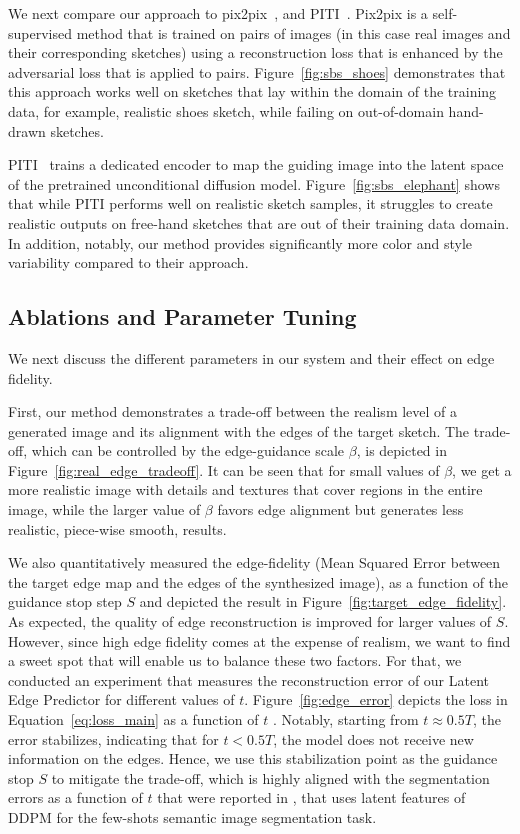 We next compare our approach to pix2pix~\cite{isola2017image}, and PITI~\cite{PITI22}. Pix2pix is a self-supervised method that is trained on pairs of images (in this case real images and their corresponding sketches) using a reconstruction loss that is enhanced by the adversarial loss that is applied to pairs. Figure~\ref{fig:sbs_shoes} demonstrates that this approach works well on sketches that lay within the domain of the training data, for example, realistic shoes sketch, while failing on out-of-domain hand-drawn sketches. 

PITI~\cite{PITI22} trains a dedicated encoder to map the guiding image into the latent space of the pretrained unconditional diffusion model. 
Figure~\ref{fig:sbs_elephant} shows that while PITI performs well on realistic sketch samples, it struggles to create realistic outputs on free-hand sketches that are out of their training data domain. In addition, notably, our method provides significantly more color and style variability compared to their approach.

\subsection{Ablations and Parameter Tuning}
\label{sec:parameters}
We next discuss the different parameters in our system and their effect on edge fidelity.

First, our method demonstrates a trade-off between the realism level of a generated image and its alignment with the edges of the target sketch. The trade-off, which can be controlled by the edge-guidance scale $\beta$, is depicted in Figure~\ref{fig:real_edge_tradeoff}. It can be seen that for small values of $\beta$, we get a more realistic image with details and textures that cover regions in the entire image, while the larger value of $\beta$ favors edge alignment but generates less realistic, piece-wise smooth, results.

We also quantitatively measured the edge-fidelity (Mean Squared Error between the target edge map and the edges of the synthesized image), as a function of the guidance stop step $S$ and depicted the result in Figure~\ref{fig:target_edge_fidelity}. As expected, the quality of edge reconstruction is improved for larger values of $S$. However, since high edge fidelity comes at the expense of realism, we want to find a sweet spot that will enable us to balance these two factors. For that, we conducted an experiment that measures the reconstruction error of our Latent Edge Predictor for different values of $t$. Figure~\ref{fig:edge_error} depicts the loss in Equation~\ref{eq:loss_main} as a function of $t$ . Notably, starting from $t \approx 0.5T$, the error stabilizes, indicating that for  $t < 0.5T$, the model does not receive new information on the edges. Hence, we use this stabilization point as the guidance stop $S$ to mitigate the trade-off, which is highly aligned with the segmentation errors as a function of $t$ that were reported in \cite{baranchuk2021label}, that uses latent features of DDPM for the few-shots semantic image segmentation task. 

